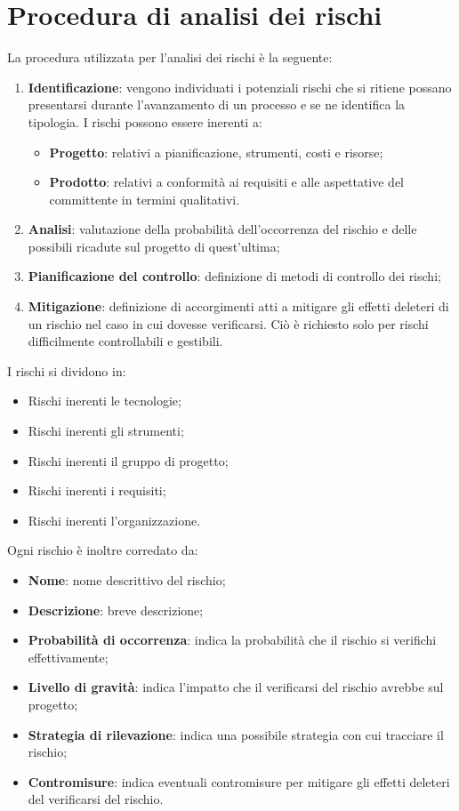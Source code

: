 \documentclass[../PianodiProgetto.tex]{subfiles}
\begin{document}
	\section{Procedura di analisi dei rischi}
	
	La procedura utilizzata per l'analisi dei rischi è la seguente:
	
	\begin{enumerate}
		\item \textbf{Identificazione}: vengono individuati i potenziali rischi che si ritiene possano presentarsi durante
		l’avanzamento di un processo e se ne identifica la tipologia. I rischi possono essere inerenti a: 
		\begin{itemize}
			\item \textbf{Progetto}: relativi a pianificazione, strumenti, costi e risorse;
			\item \textbf{Prodotto}: relativi a conformità ai requisiti e alle aspettative del committente in termini qualitativi.
		\end{itemize}
		\item \textbf{Analisi}: valutazione della probabilità dell’occorrenza del rischio e delle possibili ricadute
		sul progetto di quest'ultima;
		\item \textbf{Pianificazione del controllo}: definizione di metodi di controllo dei rischi;
		\item \textbf{Mitigazione}: definizione di accorgimenti atti a mitigare gli effetti deleteri di un rischio nel caso in cui dovesse verificarsi. Ciò è richiesto solo per rischi
		difficilmente controllabili e gestibili.
	\end{enumerate}

	I rischi si dividono in:
		\begin{itemize}
			\item Rischi inerenti le tecnologie;
			\item Rischi inerenti gli strumenti;
			\item Rischi inerenti il gruppo di progetto;
			\item Rischi inerenti i requisiti;
			\item Rischi inerenti l'organizzazione.
		\end{itemize}

	Ogni rischio è inoltre corredato da:
	
	\begin{itemize}
		\item \textbf{Nome}: nome descrittivo del rischio;
		\item \textbf{Descrizione}: breve descrizione;
		\item \textbf{Probabilità di occorrenza}: indica la probabilità che il rischio si verifichi effettivamente;
		\item \textbf{Livello di gravità}: indica l'impatto che il verificarsi del rischio avrebbe sul progetto;
		\item \textbf{Strategia di rilevazione}: indica una possibile strategia con cui tracciare il rischio;
		\item \textbf{Contromisure}: indica eventuali contromisure per mitigare gli effetti deleteri del verificarsi del rischio.
	\end{itemize}
	
\end{document}
